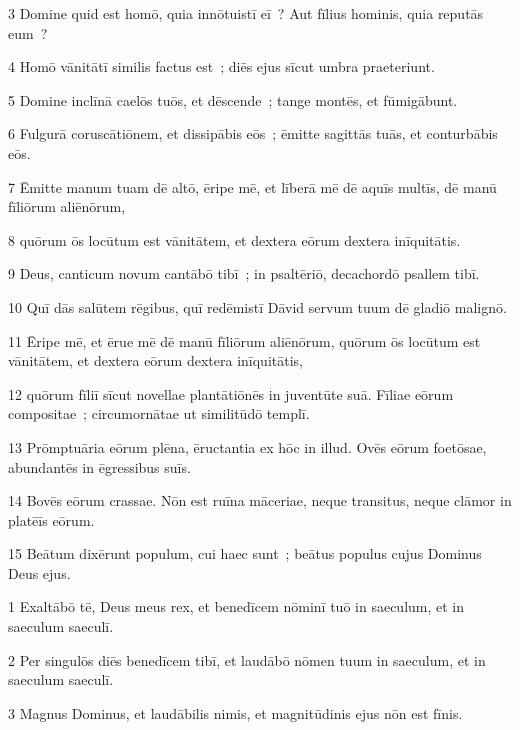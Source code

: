 \psalmVerse
  {\phantom{00}3}
  {Domine quid est homō, quia innōtuistī eī~? Aut fīlius hominis, quia reputās eum~?}


\psalmVerse
  {\phantom{00}4}
  {Homō vānitātī similis factus est~; diēs ejus sīcut umbra praeteriunt.}


\psalmVerse
  {\phantom{00}5}
  {Domine inclīnā caelōs tuōs, et dēscende~; tange montēs, et fūmigābunt.}


\psalmVerse
  {\phantom{00}6}
  {Fulgurā coruscātiōnem, et dissipābis eōs~; ēmitte sagittās tuās, et conturbābis eōs.}


\psalmVerse
  {\phantom{00}7}
  {Ēmitte manum tuam dē altō, ēripe mē, et līberā mē dē aquīs multīs, dē manū fīliōrum aliēnōrum,}


\psalmVerse
  {\phantom{00}8}
  {quōrum ōs locūtum est vānitātem, et dextera eōrum dextera inīquitātis.}


\psalmVerse
  {\phantom{00}9}
  {Deus, canticum novum cantābō tibī~; in psaltēriō, decachordō psallem tibī.}


\psalmVerse
  {\phantom{0}10}
  {Quī dās salūtem rēgibus, quī redēmistī Dāvid servum tuum dē gladiō malignō.}


\psalmVerse
  {\phantom{0}11}
  {Ēripe mē, et ērue mē dē manū fīliōrum aliēnōrum, quōrum ōs locūtum est vānitātem, et dextera eōrum dextera inīquitātis,}


\psalmVerse
  {\phantom{0}12}
  {quōrum fīliī sīcut novellae plantātiōnēs in juventūte suā. Fīliae eōrum compositae~; circumornātae ut similitūdō templī.}


\psalmVerse
  {\phantom{0}13}
  {Prōmptuāria eōrum plēna, ēructantia ex hōc in illud. Ovēs eōrum foetōsae, abundantēs in ēgressibus suīs.}


\psalmVerse
  {\phantom{0}14}
  {Bovēs eōrum crassae. Nōn est ruīna māceriae, neque transitus, neque clāmor in platēīs eōrum.}


\psalmVerse
  {\phantom{0}15}
  {Beātum dixērunt populum, cui haec sunt~; beātus populus cujus Dominus Deus ejus.}



\psalmVerse
  {\phantom{00}1}
  {Exaltābō tē, Deus meus rex, et benedīcem nōminī tuō in saeculum, et in saeculum saeculī.}


\psalmVerse
  {\phantom{00}2}
  {Per singulōs diēs benedīcem tibī, et laudābō nōmen tuum in saeculum, et in saeculum saeculī.}


\psalmVerse
  {\phantom{00}3}
  {Magnus Dominus, et laudābilis nimis, et magnitūdinis ejus nōn est fīnis.}


